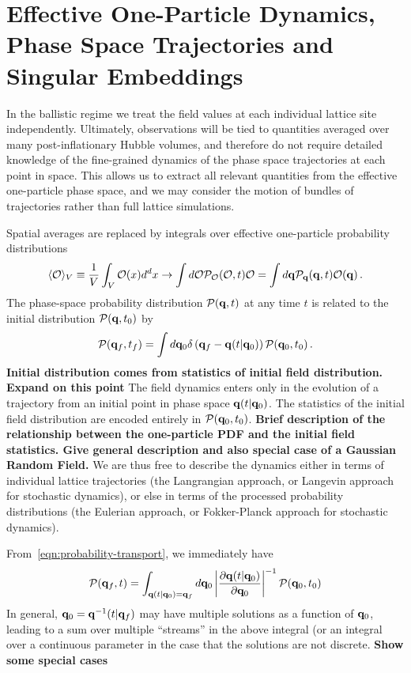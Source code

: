 \section{Effective One-Particle Dynamics, Phase Space Trajectories and Singular Embeddings}
In the ballistic regime we treat the field values at each individual lattice site independently.
Ultimately, observations will be tied to quantities averaged over many post-inflationary Hubble volumes, and therefore do not require detailed knowledge of the fine-grained dynamics of the phase space trajectories at each point in space.
This allows us to extract all relevant quantities from the effective one-particle phase space, and we may consider the motion of bundles of trajectories rather than full lattice simulations.

Spatial averages are replaced by integrals over effective one-particle probability distributions
\begin{equation}
  \langle\mathcal{O}\rangle_V \equiv \frac{1}{V}\int_V \mathcal{O}(x) d^dx \to \int d\mathcal{O} \mathcal{P}_{\mathcal{O}}(\mathcal{O},t)\mathcal{O} = \int d{\bf q} \mathcal{P}_{{\bf q}}({\bf q},t)\mathcal{O}({\bf q}) \, .
\end{equation}
The phase-space probability distribution $\mathcal{P}({\bf q},t)$ at any time $t$ is related to the initial distribution $\mathcal{P}({\bf q},t_0)$ by
\begin{equation} \label{eqn:probability-transport}
  \mathcal{P}({\bf q}_f,t_f) = \int d{\bf q}_0\delta\left({\bf q}_f-{\bf q}(t|{\bf q}_0)\right)\mathcal{P}({\bf q}_0,t_0) \, .
\end{equation}
{\bf Initial distribution comes from statistics of initial field distribution.  Expand on this point}
The field dynamics enters only in the evolution of a trajectory from an initial point in phase space ${\bf q}(t|{\bf q}_0)$.
The statistics of the initial field distribution are encoded entirely in $\mathcal{P}({\bf q}_0,t_0)$.
{\bf Brief description of the relationship between the one-particle PDF and the initial field statistics.  Give general description and also special case of a Gaussian Random Field.}
We are thus free to describe the dynamics either in terms of individual lattice trajectories (the Langrangian approach, or Langevin approach for stochastic dynamics),
or else in terms of the processed probability distributions (the Eulerian approach, or Fokker-Planck approach for stochastic dynamics).

From~\eqref{eqn:probability-transport}, we immediately have
\begin{equation}
  \mathcal{P}({\bf q}_f,t) = \int_{{\bf q}(t|{\bf q}_0)={\bf q}_f}d{\bf q}_0 \left|\frac{\partial{\bf q}(t|{\bf q}_0)}{\partial{\bf q}_0} \right|^{-1} \mathcal{P}({\bf q}_0,t_0)
\end{equation}
In general, ${\bf q}_0 = {\bf q}^{-1}(t|{\bf q}_f)$ may have multiple solutions as a function of ${\bf q}_0$, leading to a sum over multiple ``streams'' in the above integral (or an integral over a continuous parameter in the case that the solutions are not discrete.
{\bf Show some special cases}

